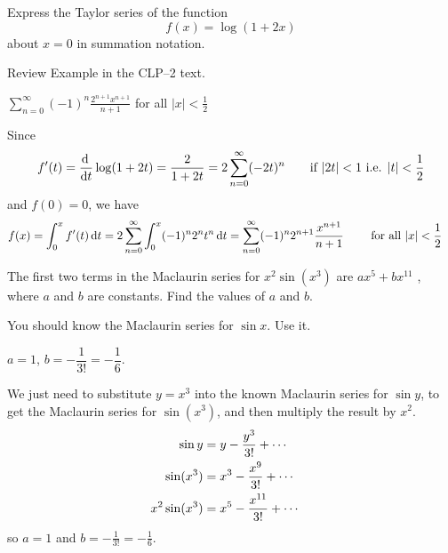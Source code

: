 \begin{Mquestion}[M105 2012A]
Express the Taylor series of the function
\begin{equation*}
f(x) = \log(1 + 2x)
\end{equation*}
about $x = 0$ in summation notation.
\end{Mquestion}

\begin{hint}
Review Example  in the CLP--2 text.
\end{hint}

\begin{answer}
$\displaystyle\sum_{n=0}^\infty  (-1)^n  \frac{2^{n+1} x^{n+1}}{n+1}$
for all $|x|<\frac{1}{2}$
\end{answer}

\begin{solution}
Since
\begin{equation*}
f'(t) =\diff{}{t}\log(1+2t) = \frac{2}{1+2t} = 2\sum_{n=0}^\infty(-2t)^n
\qquad\text{if }|2t|<1\text{ i.e. }|t|<\frac{1}{2}
\end{equation*}
and $f(0)=0$, we have
\begin{align*}
f(x)
&=\int_0^x f'(t) \,\mathrm{d}t
=2 \sum_{n=0}^\infty \int_0^x (-1)^n 2^n t^n\,\mathrm{d}t
=\sum_{n=0}^\infty  (-1)^n 2^{n+1} \frac{x^{n+1}}{n+1}
\qquad\text{ for all }|x|<\frac{1}{2}
\end{align*}
\end{solution}



\begin{question}[2013A]
The first two terms in the Maclaurin series for
$x^2 \sin(x^3)$ are $ax^5 + bx^{11}$ , where $a$ and
$b$ are constants. Find the values of $a$ and $b$.
\end{question}

\begin{hint}
You should know the Maclaurin series for $\sin x$. Use it.
\end{hint}

\begin{answer}
 $a=1$, $b=-\dfrac{1}{3!}=-\dfrac{1}{6}$.
\end{answer}

\begin{solution}
We just need to substitute $y=x^3$ into the known Maclaurin series for $\sin y$,
to get the Maclaurin series for $\sin(x^3)$, and then multiply the result
by $x^2$.
\begin{align*}
\sin y&= y-\frac{y^3}{3!}+\cdots \cr
\sin(x^3)&= x^3-\frac{x^9}{3!}+\cdots \cr
x^2\sin(x^3)&= x^5-\frac{x^{11}}{3!}+\cdots \cr
\end{align*}
so $a=1$ and $b=-\frac{1}{3!}=-\frac{1}{6}$.

\end{solution}


